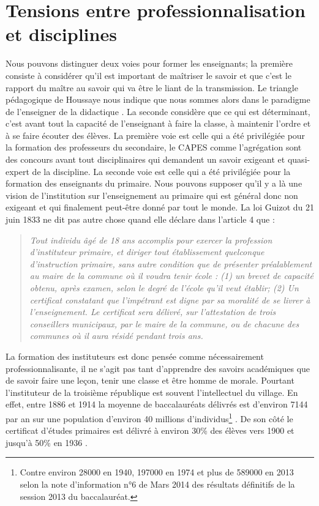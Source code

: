 \documentclass[a4paper,11pt]{article}
\begin{document}
	\section{Tensions entre professionnalisation et disciplines}

Nous pouvons distinguer deux voies pour former les enseignants; la première consiste à considérer qu'il est important de maîtriser le savoir et que c'est le rapport du maître au savoir qui va être le liant de la transmission. Le triangle pédagogique de Houssaye nous indique que nous sommes alors dans le paradigme de l'enseigner de la didactique \cite{houssaye00}. La seconde considère que ce qui est déterminant, c'est avant tout la capacité de l'enseignant à faire la classe, à maintenir l'ordre et à se faire écouter des élèves. La première voie est celle qui a été privilégiée pour la formation des professeurs du secondaire, le CAPES comme l'agrégation sont des concours avant tout disciplinaires qui demandent un savoir exigeant et quasi-expert de la discipline. La seconde voie est celle qui a été privilégiée pour la formation des enseignants du primaire. Nous pouvons supposer qu'il y a là une vision de l'institution sur l'enseignement au primaire qui est général donc non exigeant et qui finalement peut-être donné par tout le monde. La loi Guizot du 21 juin 1833 ne dit pas autre chose quand elle déclare dans l'article 4 que :
\begin{quote}
\emph{Tout individu âgé de 18 ans accomplis pour exercer la profession d'instituteur primaire, et diriger tout établissement quelconque d'instruction primaire, sans autre condition que de présenter préalablement au maire de la commune où il voudra tenir école : (1) un brevet de capacité obtenu, après examen, selon le degré de l'école qu'il veut établir; (2) Un certificat constatant que l'impétrant est digne par sa moralité de se livrer à l'enseignement. Le certificat sera délivré, sur l'attestation de trois conseillers municipaux, par le maire de la commune, ou de chacune des communes où il aura résidé pendant trois ans.}
\end{quote}
La formation des instituteurs est donc pensée comme nécessairement professionnalisante, il ne s'agit pas tant d'apprendre des savoirs académiques que de savoir faire une leçon, tenir une classe et être homme de morale. Pourtant l'instituteur de la troisième république est souvent l'intellectuel du village. En effet, entre 1886 et 1914 la moyenne de baccalauréats délivrés est d'environ 7144 par an sur une population d'environ 40 millions d'individus\footnote{Contre environ 28000 en 1940, 197000 en 1974 et plus de 589000 en 2013 selon la note d'information n°6 de Mars 2014 des résultats définitifs de la session 2013 du baccalauréat.} \cite{chesnais75}. De son côté le certificat d'études primaires est délivré à environ 30\% des élèves vers 1900 et jusqu'à 50\% en 1936 \cite{lang11}. 
\end{document}
